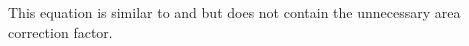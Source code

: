 \documentclass[numberedappendix]{emulateapj}
\newcommand\ALc[1]{{\color{red} \bf #1}} %
\begin{document}
This equation is similar to \citet{2007MNRAS.376.1680P} and \citet{2005ApJ...626....1B} but does not contain the unnecessary area correction factor.


\end{document}
